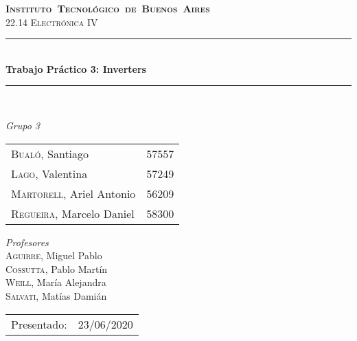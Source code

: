 \begin{titlepage}
\newcommand{\HRule}{\rule{\linewidth}{0.5mm}}
\center
\mbox{\textsc{\LARGE \bfseries {Instituto Tecnol\'ogico de Buenos Aires}}}\\[1.5cm]
\textsc{\Large 22.14 Electrónica IV}\\[0.5cm]


\HRule \\[0.6cm]
{ \Huge \bfseries Trabajo Pr\'actico 3: Inverters}\\[0.4cm] %
\HRule \\[1.5cm]


{\large

\emph{Grupo 3}\\
\vspace{3px}

\begin{tabular}{lr} 	
\textsc{Bualó}, Santiago  & 57557 \\
\textsc{Lago}, Valentina  & 57249 \\
\textsc{Martorell}, Ariel Antonio & 56209 \\
\textsc{Regueira}, Marcelo Daniel  & 58300 \\
\end{tabular}

\vspace{20px}

\emph{Profesores}\\
\vspace{3px}
\textsc{Aguirre}, Miguel Pablo\\ 	
\textsc{Cossutta}, Pablo Martín\\ 	
\textsc{Weill}, María Alejandra\\ 	
\textsc{Salvati}, Matías Damián\\ 	

\vspace{100px}

\begin{tabular}{ll}

Presentado: & 23/06/2020\\

\end{tabular}

}

\vfill

\end{titlepage}